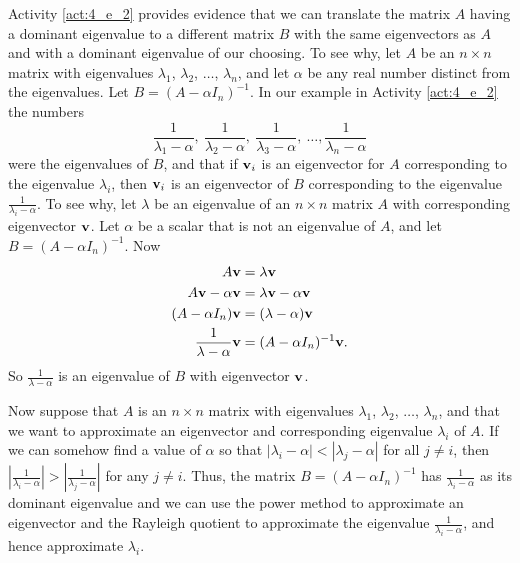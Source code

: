 Activity \ref{act:4_e_2} provides evidence that we can translate the matrix $A$ having a dominant eigenvalue to a different matrix $B$ with the same eigenvectors as $A$ and with a dominant eigenvalue of our choosing. To see why, let $A$ be an $n \times n$ matrix with eigenvalues $\lambda_1$, $\lambda_2$, $\ldots$, $\lambda_n$, and let $\alpha$ be any real number distinct from the eigenvalues. Let $B = (A - \alpha I_n)^{-1}$. In our example in Activity \ref{act:4_e_2} the numbers 
\[\frac{1}{\lambda_1 - \alpha}, \  \frac{1}{\lambda_2 - \alpha}, \ \frac{1}{\lambda_3 - \alpha}, \ \ldots, \frac{1}{\lambda_n - \alpha}\]
were the eigenvalues of $B$, and that if $\mathbf{v}_i$ is an eigenvector for $A$ corresponding to the eigenvalue $\lambda_i$, then $\mathbf{v}_i$ is an eigenvector of $B$ corresponding to the eigenvalue $\frac{1}{\lambda_i - \alpha}$. To see why, let $\lambda$ be an eigenvalue of an $n \times n$ matrix $A$ with corresponding eigenvector $\mathbf{v}$. Let $\alpha$ be a scalar that is not an eigenvalue of $A$, and let $B = (A - \alpha I_n)^{-1}$. Now 
\begin{align*}
A \mathbf{v} &= \lambda \mathbf{v} \\
A \mathbf{v} - \alpha \mathbf{v} &= \lambda \mathbf{v} - \alpha \mathbf{v} \\
(A-\alpha I_n) \mathbf{v} &= (\lambda - \alpha) \mathbf{v} \\
\frac{1}{\lambda - \alpha} \mathbf{v} &= (A-\alpha I_n)^{-1} \mathbf{v}.
\end{align*}
So $\frac{1}{\lambda - \alpha}$ is an eigenvalue of $B$ with eigenvector $\mathbf{v}$. 

Now suppose that $A$ is an $n \times n$ matrix with eigenvalues $\lambda_1$, $\lambda_2$, $\ldots$, $\lambda_n$, and that we want to approximate an eigenvector and corresponding eigenvalue $\lambda_i$ of $A$. If we can somehow find a value of $\alpha$ so that $|\lambda_i - \alpha| < |\lambda_j - \alpha|$ for all $j \neq i$, then $\left| \frac{1}{\lambda_i - \alpha} \right| > \left| \frac{1}{\lambda_j - \alpha} \right|$ for any $j \neq i$. Thus, the matrix $B = (A - \alpha I_n)^{-1}$ has $\frac{1}{\lambda_i - \alpha}$ as its dominant eigenvalue and we can use the power method to approximate an eigenvector and the Rayleigh quotient to approximate the eigenvalue $\frac{1}{\lambda_i - \alpha}$, and hence approximate $\lambda_i$.  



